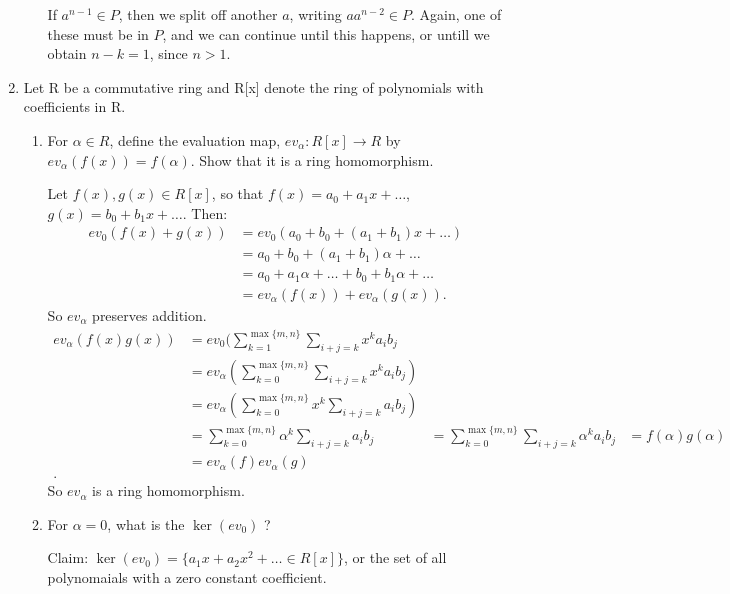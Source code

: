 \documentclass{article}
\begin{document}
\begin{enumerate}
\begin{enumerate}[label= (\alph*)]
        If $a^{n-1}\in P$, then we split off another $a$, writing $aa^{n-2}\in P$. Again, one of these 
        must be in $P$, and we can continue until this happens, or untill we obtain $n-k=1$, 
        since $n> 1$.

    \end{enumerate}
\item Let R be a commutative ring and R[x] denote the ring of polynomials with coefficients in R.
    \begin{enumerate}[label= (\alph*)]
        \item For $\alpha \in  R$, define the evaluation map, $ev_\alpha : R[x] \to  R$ by $ev_\alpha(f(x)) = f(\alpha)$. Show that it
        is a ring homomorphism.

        Let $f(x),g(x)\in R[x]$, so that $f(x)=a_0+a_1x+\ldots$, $g(x)=b_0+b_1x+\ldots$. Then:
        \begin{align*}
            ev_0(f(x)+g(x))&=ev_0(a_0+b_0+(a_1+b_1)x+\ldots)\\
            &= a_0+b_0+(a_1+b_1)\alpha+\ldots \\
            &= a_0+a_1\alpha+\ldots+b_0+b_1\alpha+\ldots \\
            &= ev_\alpha(f(x))+ev_\alpha(g(x))
        .\end{align*}
        So $ev_\alpha$ preserves addition.
        \begin{align*}
            ev_\alpha(f(x)g(x))&= ev_0(\sum_{k=1}^{\max \{m,n\} }\sum_{i+j=k}^{} x^{k}a_ib_j \\
            &= ev_\alpha(\sum_{k=0}^{\max \{m,n\} }\sum_{i+j=k}^{} x^{k}a_ib_j) \\
            &= ev_\alpha(\sum_{k=0}^{\max \{m,n\} }x^{k}\sum_{i+j=k}^{} a_ib_j) \\
            &= \sum_{k=0}^{\max \{m,n\} }\alpha^{k}\sum_{i+j=k}^{} a_ib_j 
            &= \sum_{k=0}^{\max \{m,n\} }\sum_{i+j=k}^{}\alpha^{k} a_ib_j 
            &= f(\alpha)g(\alpha) \\
            &= ev_\alpha(f)ev_\alpha(g) \\
        .\end{align*}
        So $ev_\alpha$ is a ring homomorphism.

        \item For $\alpha = 0$, what is the $\ker(ev_0)$ ?

            Claim: $\ker(ev_0)=\{a_1x+a_2x^2+\ldots\in R[x]\}$, or the set of all polynomaials with a zero constant
            coefficient.


\end{enumerate}
\end{enumerate}
\end{document}
